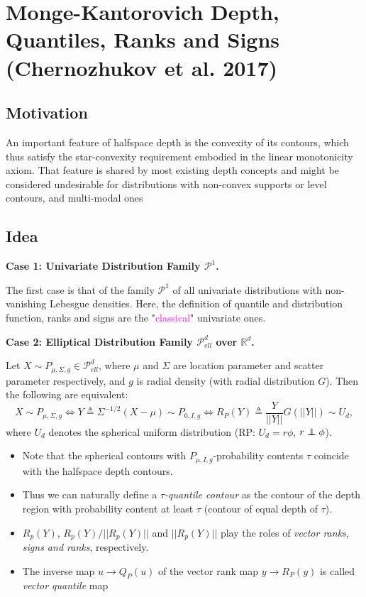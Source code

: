 \chapter{Monge-Kantorovich Depth, Quantiles, Ranks and Signs (Chernozhukov et al. 2017)}
\section{Motivation}
\faQuoteLeft  An important feature of halfspace depth is the convexity of its contours, which thus satisfy the star-convexity requirement embodied in the linear monotonicity axiom. That feature is shared by most existing depth concepts and might be considered undesirable for distributions with non-convex supports or level contours, and multi-modal ones \faQuoteRight 

\section{Idea}
\textbf{Case 1: Univariate Distribution Family $\mathcal{P}^1$.}

The first case is that of the family $\mathcal{P}^1$ of all univariate distributions with non-vanishing Lebesgue densities. Here, the definition of quantile and distribution function, ranks and signs are the "\textcolor{magenta}{classical}" univariate ones.

\noindent\textbf{Case 2: Elliptical Distribution Family $\mathcal{P}_{ell}^d$ over $\mathbb{R}^d$.}

Let $X \sim P_{\mu, \Sigma, g} \in \mathcal{P}_{ell}^d$, where $\mu$ and $\Sigma$ are location parameter and scatter parameter respectively, and $g$ is radial density (with radial distribution $G$). Then the following are equivalent:
\[
X \sim P_{\mu, \Sigma, g} \iff Y \triangleq \Sigma^{-1/2}(X - \mu) \sim P_{0, I, g} \iff R_P(Y) \triangleq \frac{Y}{||Y||}G(||Y||) \sim U_d,
\]
where $U_d$ denotes the spherical uniform distribution (RP: $U_d = r\phi$, $r \independent \phi$). 
\begin{itemize}
	\item Note that the spherical contours with $P_{\mu, I, g}$-probability contents $\tau$ coincide with the halfspace depth contours. 
	\item Thus we can naturally define a \textit{$\tau$-quantile contour} as the contour of the depth region with probability content at least $\tau$ (contour of equal depth of $\tau$). 
	\item $R_p(Y)$, $R_p(Y)/||R_p(Y)||$ and $||R_p(Y)||$ play the roles of \textit{vector ranks, signs and ranks}, respectively. 
	\item The inverse map $u \longrightarrow Q_P(u)$ of the vector rank map $y \longrightarrow R_P(y)$ is called \textit{vector quantile} map 
\end{itemize}

